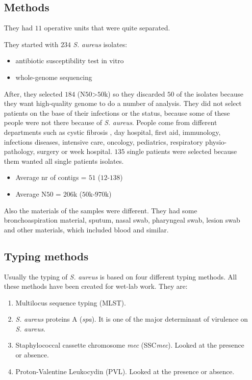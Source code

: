 \subsection{Methods}

They had $11$ operative units that were quite separated. 

They started with $234$ \emph{S. aureus} isolates:

\begin{itemize}
    \item antibiotic susceptibility test in vitro
    \item whole-genome sequencing
\end{itemize}

After, they selected $184$ (N$50$>$50$k) so they discarded $50$ of the isolates because they want high-quality genome to do a number of analysis.
They did not select patients on the base of their infections or the status, because some of these people were not there because of \emph{S. aureus}.
People come from different departments such as cystic fibrosis , day hospital, first aid,  immunology, infections diseases, intensive care, oncology, pediatrics, respiratory physio-pathology, surgery or week hospital. 
$135$ single patients were selected because them wanted all single patients isolates. 

\begin{itemize}
    \item Average nr of contigs = $51$ ($12$-$138$)
    \item Average N$50$ = $206$k ($50$k-$970$k)
\end{itemize}

Also the materials of the samples were different. They had some bronchoaspiration material, sputum, nasal swab, pharyngeal swab, lesion swab and other materials, which included blood and similar.


\subsection{Typing methods}

Usually the typing of \emph{S. aureus} is based on four different typing methods. All these methods have been created for wet-lab work. They are:

\begin{enumerate}
    \item Multilocus sequence typing (MLST).
    \item \emph{S. aureus} proteins A (\emph{spa}). It is one of the major determinant of virulence on \emph{S. aureus}.
    \item Staphylococcal cassette chromosome \emph{mec} (SSC\emph{mec}). Looked at the presence or absence.
    \item Proton-Valentine Leukocydin (PVL). Looked at the presence or absence.
\end{enumerate}

